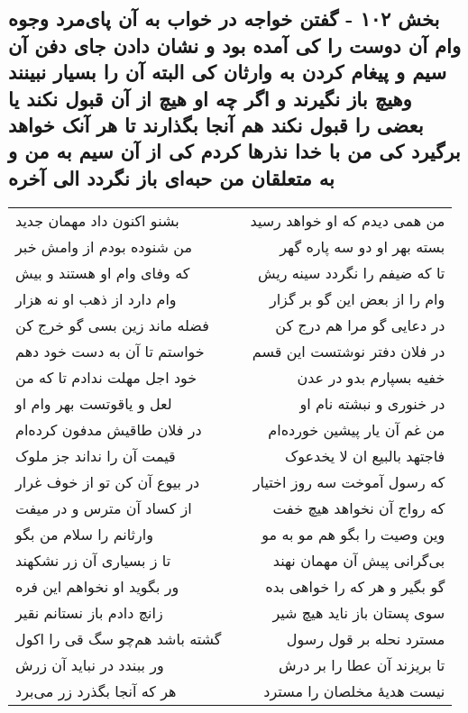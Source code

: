 \begin{center}
\section*{بخش ۱۰۲ - گفتن خواجه در خواب به آن پای‌مرد وجوه وام آن دوست را کی آمده بود و نشان دادن جای دفن آن سیم و پیغام کردن به وارثان کی البته آن را بسیار نبینند وهیچ باز نگیرند و اگر چه او هیچ از آن قبول  نکند یا بعضی را قبول نکند هم آنجا بگذارند تا هر آنک خواهد برگیرد کی من با خدا نذرها کردم کی از آن سیم به من و به متعلقان من حبه‌ای باز نگردد الی آخره}
\label{sec:sh102}
\begin{longtable}{l p{0.5cm} r}
بشنو اکنون داد مهمان جدید
&&
من همی دیدم که او خواهد رسید
\\
من شنوده بودم از وامش خبر
&&
بسته بهر او دو سه پاره گهر
\\
که وفای وام او هستند و بیش
&&
تا که ضیفم را نگردد سینه ریش
\\
وام دارد از ذهب او نه هزار
&&
وام را از بعض این گو بر گزار
\\
فضله ماند زین بسی گو خرج کن
&&
در دعایی گو مرا هم درج کن
\\
خواستم تا آن به دست خود دهم
&&
در فلان دفتر نوشتست این قسم
\\
خود اجل مهلت ندادم تا که من
&&
خفیه بسپارم بدو در عدن
\\
لعل و یاقوتست بهر وام او
&&
در خنوری و نبشته نام او
\\
در فلان طاقیش مدفون کرده‌ام
&&
من غم آن یار پیشین خورده‌ام
\\
قیمت آن را نداند جز ملوک
&&
فاجتهد بالبیع ان لا یخدعوک
\\
در بیوع آن کن تو از خوف غرار
&&
که رسول آموخت سه روز اختیار
\\
از کساد آن مترس و در میفت
&&
که رواج آن نخواهد هیچ خفت
\\
وارثانم را سلام من بگو
&&
وین وصیت را بگو هم مو به مو
\\
تا ز بسیاری آن زر نشکهند
&&
بی‌گرانی پیش آن مهمان نهند
\\
ور بگوید او نخواهم این فره
&&
گو بگیر و هر که را خواهی بده
\\
زانچ دادم باز نستانم نقیر
&&
سوی پستان باز ناید هیچ شیر
\\
گشته باشد هم‌چو سگ قی را اکول
&&
مسترد نحله بر قول رسول
\\
ور ببندد در نباید آن زرش
&&
تا بریزند آن عطا را بر درش
\\
هر که آنجا بگذرد زر می‌برد
&&
نیست هدیهٔ مخلصان را مسترد
\\

\end{longtable}
\end{center}
